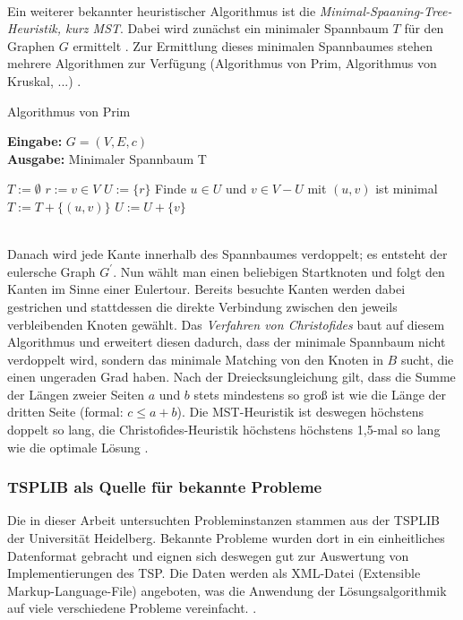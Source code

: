 \documentclass[doktyp=barbeit, sprache=german]{TUBAFarbeiten}
\begin{document}
\\Ein weiterer bekannter heuristischer Algorithmus ist die \textit{Minimal-Spaaning-Tree-Heuristik, kurz MST}. Dabei wird zunächst ein minimaler Spannbaum $T$ für den Graphen $G$ ermittelt \cite{Groetschel2005}. Zur Ermittlung dieses minimalen Spannbaumes stehen mehrere Algorithmen zur Verfügung (Algorithmus von Prim, Algorithmus von Kruskal, ...) \cite{MST}. 
\begin{algorithm}
\caption{Algorithmus von Prim}
\label{prim}
\textbf{Eingabe:} $G = (V,E,c)$
\\\textbf{Ausgabe:} Minimaler Spannbaum T
\begin{algorithmic}[1]
\State $T := \emptyset$
\State $r := v \in V$
\State $U := \{r\}$
\State Finde $u \in U$ und $v \in V - U$ mit $(u,v)$ ist minimal
\State $T := T + \{(u,v)\}$
\State $U := U + \{v\}$
\EndWhile
\end{algorithmic}
\end{algorithm}
\\Danach wird jede Kante innerhalb des Spannbaumes verdoppelt; es entsteht der eulersche Graph $G^\prime$. Nun wählt man einen beliebigen Startknoten und folgt den Kanten im Sinne einer Eulertour. Bereits besuchte Kanten werden dabei gestrichen und stattdessen die direkte Verbindung zwischen den jeweils verbleibenden Knoten gewählt. Das \textit{Verfahren von Christofides} baut auf diesem Algorithmus und erweitert diesen dadurch, dass der minimale Spannbaum nicht verdoppelt wird, sondern das minimale Matching von den Knoten in $B$ sucht, die einen ungeraden Grad haben. Nach der Dreiecksungleichung gilt, dass die Summe der Längen zweier Seiten $a$ und $b$ stets mindestens so groß ist wie die Länge der dritten Seite (formal: $c \leq a + b$). Die MST-Heuristik ist deswegen höchstens doppelt so lang, die Christofides-Heuristik höchstens höchstens 1,5-mal so lang wie die optimale Lösung \cite{Groetschel2005}.
\subsubsection{TSPLIB als Quelle für bekannte Probleme} \label{TSPLIB}
Die in dieser Arbeit untersuchten Probleminstanzen stammen aus der TSPLIB der Universität Heidelberg. Bekannte Probleme wurden dort in ein einheitliches Datenformat gebracht und eignen sich deswegen gut zur Auswertung von Implementierungen des TSP. Die Daten werden als XML-Datei (Extensible Markup-Language-File) angeboten, was die Anwendung der Lösungsalgorithmik auf viele verschiedene Probleme vereinfacht. \cite{TSPLIB}.
\end{document}
